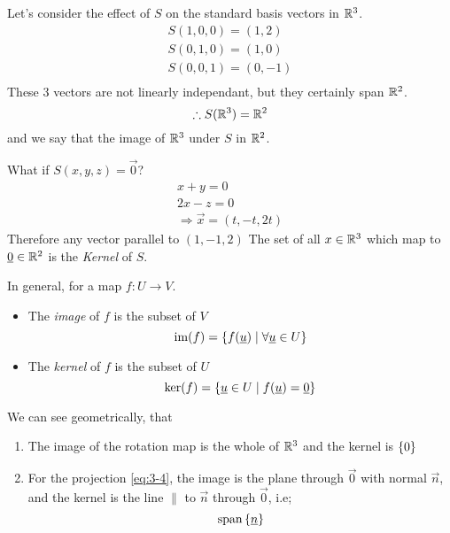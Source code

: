 \documentclass{article}
\numberwithin{equation}{section}
\begin{document}
\begin{remark}
    Let's consider the effect of $S$ on the standard basis vectors in $\mathbb{R}^3$.
    \begin{align*}
        S(1, 0, 0) = (1, 2) \\
        S(0, 1, 0) = (1, 0) \\
        S(0, 0, 1) = (0, -1) \\
    \end{align*}
    These $3$ vectors are not linearly independant, but they certainly span $\mathbb{R}^2$.
    \[
        \therefore S(\mathbb{R}^3) = \mathbb{R}^2  
    \]
    and we say that the image of $\mathbb{R}^3$ under $S$ in $\mathbb{R}^2$.

    What if $S(x, y, z) = \vec 0$?
    \begin{align*}
        x + y = 0 \\
        2x - z = 0 \\
        \Rightarrow \vec x = (t, -t, 2t)
    \end{align*}
    Therefore any vector parallel to $(1, -1, 2)$
    The set of all $x \in \mathbb{R}^3$ which map to $\underline{0} \in \mathbb{R}^2$ is the \emph{Kernel} of $S$.
\end{remark}
\begin{defi}
    In general, for a map $f: U \rightarrow V$. 
    \begin{itemize}
        \item The \emph{image} of $f$ is the subset of $V$
        \[
            \operatorname{im}(f) = \left\{ f(\underline{u}) \mid \forall \underline{u} \in U \right\}  
        \]
        \item The \emph{kernel} of $f$ is the subset of $U$
        \[
            \ker(f) = \left\{ \underline{u} \in U \mid f(\underline{u}) = \underline{0} \right\}  
        \]
    \end{itemize}
\end{defi}
We can see geometrically, that
\begin{enumerate}
    \item The image of the rotation map is the whole of $\mathbb{R}^3$ and the kernel is $\left\{ 0 \right\}$
    \item For the projection \eqref{eq:3-4}, the image is the plane through $\vec 0$ with normal $\vec n$, and the kernel is the line $\parallel$ to $\vec n$ through $\vec 0$, i.e;
    \[
        \operatorname{span} \left\{ \underline{n} \right\}  
    \]
\end{enumerate}
\end{document}
